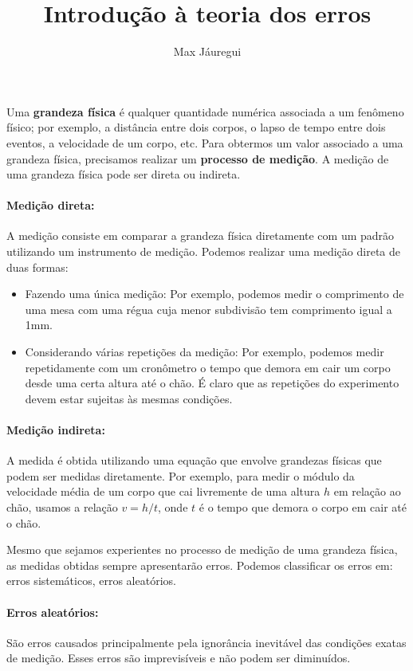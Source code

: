 \documentclass[12pt, a4paper]{article}
\title{Introdução à teoria dos erros}
\author{Max Jáuregui}
\begin{document}
\maketitle

Uma \textbf{grandeza física} é qualquer quantidade numérica associada a um fenômeno físico; por exemplo, a distância entre dois corpos, o lapso de tempo entre dois eventos, a velocidade de um corpo, etc. Para obtermos um valor associado a uma grandeza física, precisamos realizar um \textbf{processo de medição}. A medição de uma grandeza física pode ser direta ou indireta.

\paragraph{Medição direta:} A medição consiste em comparar a grandeza física diretamente com um padrão utilizando um instrumento de medição. Podemos realizar uma medição direta de duas formas:
\begin{itemize}
	\item Fazendo uma única medição: Por exemplo, podemos medir o comprimento de uma mesa com uma régua cuja menor subdivisão tem comprimento igual a 1mm.
	\item Considerando várias repetições da medição: Por exemplo, podemos medir repetidamente com um cronômetro o tempo que demora em cair um corpo desde uma certa altura até o chão. É claro que as repetições do experimento devem estar sujeitas às mesmas condições.
\end{itemize}

\paragraph{Medição indireta:}
A medida é obtida utilizando uma equação que envolve grandezas físicas que podem ser medidas diretamente. Por exemplo, para medir o módulo da velocidade média de um corpo que cai livremente de uma altura $h$ em relação ao chão, usamos a relação $v=h/t$, onde $t$ é o tempo que demora o corpo em cair até o chão.

Mesmo que sejamos experientes no processo de medição de uma grandeza física, as medidas obtidas sempre apresentarão erros. Podemos classificar os erros em: erros sistemáticos, erros aleatórios.

\paragraph{Erros aleatórios:} São erros causados principalmente pela ignorância inevitável das condições exatas de medição. Esses erros são imprevisíveis e não podem ser diminuídos.
\end{document}

